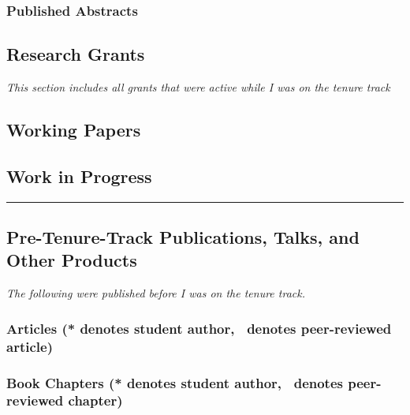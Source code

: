 \documentclass[10pt]{article}
\begin{document}
	\subsubsection{Published Abstracts}
    \begin{enumerate}
	   
    \end{enumerate}
	\subsection{Research Grants}
    \emph{This section includes all grants that were active while I was on the tenure track}
	
%	
%
\iftrue
	\subsection{Working Papers} %
	
\fi
\iftrue
    \subsection{Work in Progress}
    
\hrule

    \subsection[Pre-Tenure-Track]{Pre-Tenure-Track Publications, Talks, and Other Products}
    \emph{The following were published before I was on the tenure track.}
    
    \subsubsection[Articles]{Articles (* denotes student author, \textdagger\ denotes peer-reviewed article)}
    \begin{refsection}
        \nocite{*}
        \printbibliography[heading=none, type=article, notkeyword=tenuretrack]
    \end{refsection}
    
    \subsubsection[Book Chapters]{Book Chapters (* denotes student author, \textdagger\ denotes peer-reviewed chapter)}
    \begin{refsection}
        \nocite{*}
        \printbibliography[heading=none, type=incollection, notkeyword=tenuretrack]
    \end{refsection}
\end{document}
